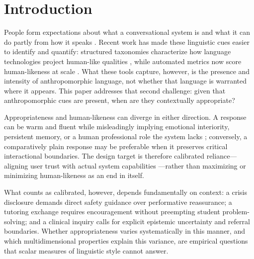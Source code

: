 \documentclass[manuscript,review,anonymous]{acmart}
\begin{document}
\section{Introduction}

People form expectations about what a conversational system is and what it can do partly from how it speaks \cite{nass2000, reeves1996}. Recent work has made these linguistic cues easier to identify and quantify: structured taxonomies characterize how language technologies project human-like qualities \cite{abercrombie2023, devrio2025}, while automated metrics now score human-likeness at scale \cite{cheng2025}. What these tools capture, however, is the presence and intensity of anthropomorphic language, not whether that language is warranted where it appears. This paper addresses that second challenge: given that anthropomorphic cues are present, when are they contextually appropriate?

Appropriateness and human-likeness can diverge in either direction. A response can be warm and fluent while misleadingly implying emotional interiority, persistent memory, or a human professional role the system lacks \cite{leong2019, Shanahan2024Talking}; conversely, a comparatively plain response may be preferable when it preserves critical interactional boundaries. The design target is therefore calibrated reliance---aligning user trust with actual system capabilities \cite{lee2004}---rather than maximizing or minimizing human-likeness as an end in itself.

What counts as calibrated, however, depends fundamentally on context: a crisis disclosure demands direct safety guidance over performative reassurance; a tutoring exchange requires encouragement without preempting student problem-solving; and a clinical inquiry calls for explicit epistemic uncertainty and referral boundaries. Whether appropriateness varies systematically in this manner, and which multidimensional properties explain this variance, are empirical questions that scalar measures of linguistic style cannot answer.

\end{document}
